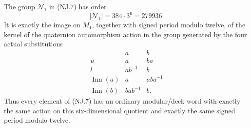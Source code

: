 \begin{proposition}
\label{prop:orthogonal-first-order-joint-normalizer}
The group \(\mathcal N_1\) in (NJ.7) has order
\[
                       |\mathcal N_1|=384\cdot3^6=279936.
 \tag{NJ.8}
\]
It is exactly the image on \(M_1\), together with signed period
modulo twelve, of the kernel of the quaternion automorphism action
in the group generated by the four actual substitutions
\[
 \begin{array}{c|cc}
       &a&b\\ \hline
 u&a&ba\\
 l&ab^{-1}&b\\
 \operatorname{Inn}(a)&a&aba^{-1}\\
 \operatorname{Inn}(b)&bab^{-1}&b.
 \end{array}
 \tag{NJ.9}
\]
Thus every element of (NJ.7) has an ordinary modular/deck word with
exactly the same action on this six-dimensional quotient and exactly
the same signed period modulo twelve.
\end{proposition}
